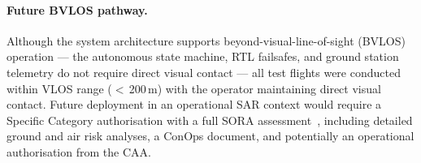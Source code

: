 \paragraph{Future BVLOS pathway.}
Although the system architecture supports beyond-visual-line-of-sight (BVLOS) operation --- the autonomous state machine, RTL failsafes, and ground station telemetry do not require direct visual contact --- all test flights were conducted within VLOS range ($<$\,200\,m) with the operator maintaining direct visual contact. Future deployment in an operational SAR context would require a Specific Category authorisation with a full SORA assessment~\cite{jarus2019sora}, including detailed ground and air risk analyses, a ConOps document, and potentially an operational authorisation from the CAA.
